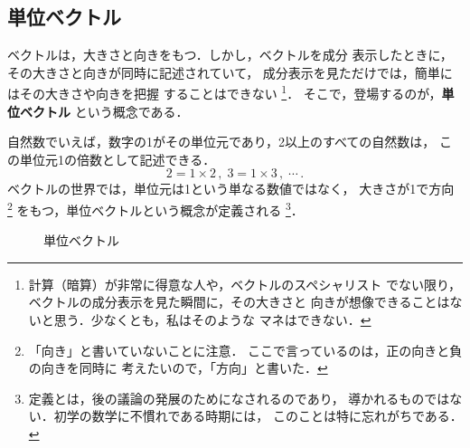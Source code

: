 ﻿%
            \subsection{単位ベクトル}
                ベクトルは，大きさと向きをもつ．しかし，ベクトルを成分
                表示したときに，その大きさと向きが同時に記述されていて，
                成分表示を見ただけでは，簡単にはその大きさや向きを把握
                することはできない
                    \footnote{
                        計算（暗算）が非常に得意な人や，ベクトルのスペシャリスト
                        でない限り，ベクトルの成分表示を見た瞬間に，その大きさと
                        向きが想像できることはないと思う．少なくとも，私はそのような
                        マネはできない．
                    }．
                そこで，登場するのが，\textbf{単位ベクトル} という概念である．

                自然数でいえば，数字の1がその単位元であり，2以上のすべての自然数は，
                この単位元1の倍数として記述できる．
                    \begin{equation*}
                        2 = 1 \times 2\,,\;3 = 1 \times 3\,,\;\cdots\,.
                    \end{equation*}
                ベクトルの世界では，単位元は1という単なる数値ではなく，
                大きさが1で方向
                    \footnote{
                        「向き」と書いていないことに注意．
                        ここで言っているのは，正の向きと負の向きを同時に
                        考えたいので，「方向」と書いた．
                    }
                をもつ，単位ベクトルという概念が定義される
                    \footnote{
                        定義とは，後の議論の発展のためになされるのであり，
                        導かれるものではない．初学の数学に不慣れである時期には，
                        このことは特に忘れがちである．
                    }．
                    \begin{figure}[hbt]
                        \begin{center}
                            \caption{単位ベクトル}
                            \label{fig:TaniVector00}
                        \end{center}
                    \end{figure}

